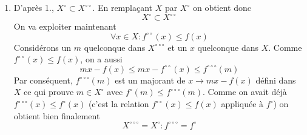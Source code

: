 \begin{enumerate}
\begin{enumerate}
\item  D'apr\`{e}s 1., $X^{\circ }\subset X^{\circ \circ }$. En rempla\c{c}ant $X$ par $X^{\circ }$ on obtient donc
\[
X^{\circ }\subset X^{\circ \circ }
\]
On va exploiter maintenant
\begin{displaymath}
\forall x\in X : f^{\circ \circ }(x)\leq f(x) 
\end{displaymath}
Consid\'{e}rons un $m$ quelconque dans $X^{\circ \circ \circ }$ et un $x$ quelconque dans $X$. Comme $f^{\circ \circ }(x)\leq f(x)$, on a aussi
\[
mx-f(x)\leq mx-f^{\circ \circ }(x)\leq f^{\circ \circ \circ }(m)
\]
Par cons\'{e}quent, $f^{\circ \circ \circ }(m)$ est un majorant de $x\rightarrow mx-f(x)$ d\'{e}fini dans $X$ ce qui prouve $m\in X^{\circ }$ avec $f^{\circ }(m)\leq f^{\circ \circ \circ }(m)$. Comme on avait d\'{e}j\`{a} $f^{\circ \circ \circ }(x)\leq f^{\circ }(x)$ (c'est la relation $f^{\circ \circ }(x)\leq f(x)$ appliqu\'{e}e \`{a} $f^{\circ }$) on obtient
bien finalement
\[
X^{\circ \circ \circ }=X^{\circ } : f^{\circ \circ \circ }=f^{\circ }
\]
\end{enumerate}
\end{enumerate}